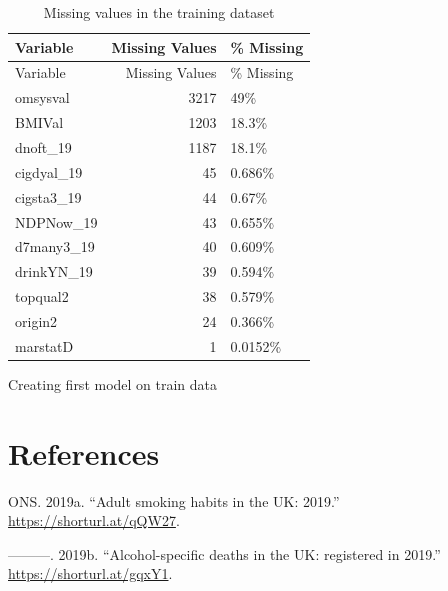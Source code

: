 \documentclass[
  11pt,
]{article}
\newlength{\cslhangindent}
\newenvironment{CSLReferences}[2] %
 {\begin{list}{}{%
  \setlength{\itemindent}{0pt}
  \setlength{\leftmargin}{0pt}
  \setlength{\parsep}{0pt}
  \ifodd #1
   \setlength{\leftmargin}{\cslhangindent}
   \setlength{\itemindent}{-1\cslhangindent}
  \fi
  \setlength{\itemsep}{#2\baselineskip}}}
 {\end{list}}
\begin{document}
\begin{longtable}[]{@{}lrl@{}}
\caption{Missing values in the training dataset}\tabularnewline
\toprule\noalign{}
Variable & Missing Values & \% Missing \\
\midrule\noalign{}
\endfirsthead
\toprule\noalign{}
Variable & Missing Values & \% Missing \\
\midrule\noalign{}
\endhead
\bottomrule\noalign{}
\endlastfoot
omsysval & 3217 & 49\% \\
BMIVal & 1203 & 18.3\% \\
dnoft\_19 & 1187 & 18.1\% \\
cigdyal\_19 & 45 & 0.686\% \\
cigsta3\_19 & 44 & 0.67\% \\
NDPNow\_19 & 43 & 0.655\% \\
d7many3\_19 & 40 & 0.609\% \\
drinkYN\_19 & 39 & 0.594\% \\
topqual2 & 38 & 0.579\% \\
origin2 & 24 & 0.366\% \\
marstatD & 1 & 0.0152\% \\
\end{longtable}

Creating first model on train data

\section*{References}\label{references}

\label{refs}
\begin{CSLReferences}{1}{0}
ONS. 2019a. {``{Adult smoking habits in the UK: 2019}.''}
\url{https://shorturl.at/qQW27}.

---------. 2019b. {``{Alcohol-specific deaths in the UK: registered in
2019}.''} \url{https://shorturl.at/gqxY1}.

\end{CSLReferences}
\end{document}
